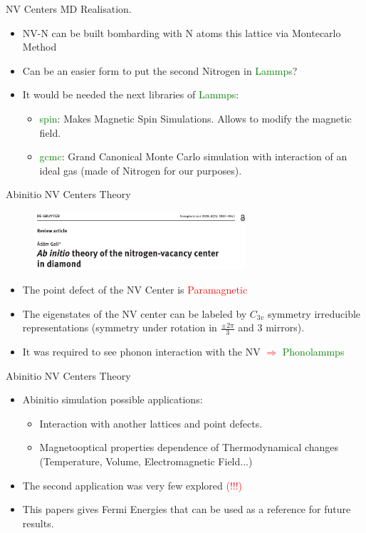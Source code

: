 \documentclass[11pt]{beamer}
\begin{document}
 \begin{frame}{NV Centers MD Realisation.}
 \begin{itemize}
     \item NV-N can be built bombarding with N atoms this lattice via Montecarlo Method 
     \item Can be an easier form to put the second Nitrogen in \textcolor{green}{Lammps}?
     \item It would be needed the next libraries of \textcolor{green}{Lammps}:
     \begin{itemize}
         \item \textcolor{green}{spin}: Makes Magnetic Spin Simulations. Allows to modify the magnetic field.
         \item \textcolor{green}{gcmc}: Grand Canonical Monte Carlo simulation with interaction of an ideal gas (made of Nitrogen for our purposes).
     \end{itemize}
 \end{itemize}
\end{frame}
\begin{frame}{Abinitio NV Centers Theory}
\begin{figure}
 \centering
    \includegraphics[width=0.7\textwidth]{pap1.png}
 \end{figure}
 \begin{itemize}
     \item The point defect of the NV Center is \textcolor{red}{Paramagnetic}
     \item The eigenstates of the NV center can be labeled by $C_{3v}$ symmetry irreducible representations (symmetry under rotation in $\frac{\pm 2\pi}{3}$ and  3 mirrors).
     \item It was required to see phonon interaction with the NV \textcolor{red}{$\Rightarrow$} \textcolor{green}{Phonolammps}
 \end{itemize}
\end{frame}
\begin{frame}{Abinitio NV Centers Theory}
 \begin{itemize}
     \item Abinitio simulation possible applications:
     \begin{itemize}
         \item Interaction with another lattices and point defects.
         \item Magnetooptical properties dependence of Thermodynamical changes (Temperature, Volume, Electromagnetic Field...)
     \end{itemize}
     \item The second application was very few explored \textcolor{red}{(!!!)}
     \item This papers gives Fermi Energies that can be used as a reference for future results.
 \end{itemize}
\end{frame}
\end{document}
